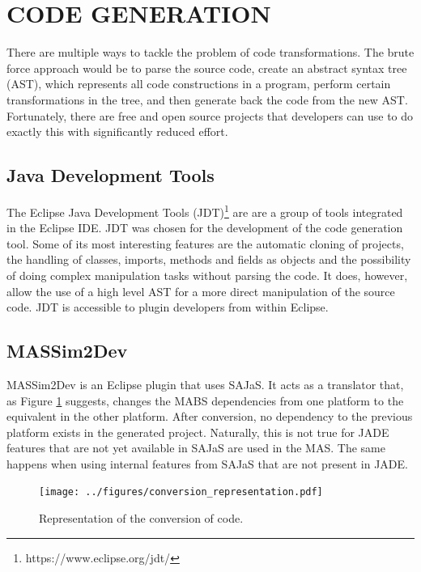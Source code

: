 \documentclass[a4paper,twoside]{article}
\begin{document}
\section{\uppercase{Code Generation}}
\label{sec:codeconversion}
\noindent There are multiple ways to tackle the problem of code transformations. The brute force approach would be to parse the source code, create an abstract syntax tree (AST), which represents all code constructions in a program, perform certain transformations in the tree, and then generate back the code from the new AST. Fortunately, there are free and open source projects that developers can use to do exactly this with significantly reduced effort.

\subsection{Java Development Tools}
The Eclipse Java Development Tools (JDT)\footnote{https://www.eclipse.org/jdt/} are are a group of tools integrated in the Eclipse IDE. JDT was chosen for the development of the code generation tool. Some of its most interesting features are the automatic cloning of projects, the handling of classes, imports, methods and fields as objects and the possibility of doing complex manipulation tasks without parsing the code. It does, however, allow the use of a high level AST for a more direct manipulation of the source code. JDT is accessible to plugin developers from within Eclipse.

\subsection{MASSim2Dev}
MASSim2Dev is an Eclipse plugin that uses SAJaS. It acts as a translator that, as Figure \ref{fig:conversion_representation} suggests, changes the MABS dependencies from one platform to the equivalent in the other platform. After conversion, no dependency to the previous platform exists in the generated project. Naturally, this is not true for JADE features that are not yet available in SAJaS are used in the MAS. The same happens when using internal features from SAJaS that are not present in JADE.

\begin{figure}[h]
	\centering
	\texttt{[image: ../figures/conversion\_representation.pdf]}
	\caption[Representation of the conversion of code]{Representation of the conversion of code.}
	\label{fig:conversion_representation}
\end{figure}
\end{document}
